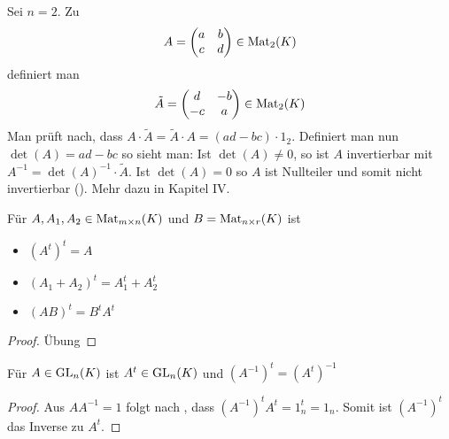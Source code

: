 \begin{example}
	Sei $n=2$. Zu
	\begin{align}
		A=\begin{pmatrix}a & b\\c & d\\\end{pmatrix} \in \operatorname{Mat}_2(K)\notag
	\end{align} 
	definiert man
	\begin{align}
		\tilde A=
		\begin{pmatrix}d & -b\\-c & a\\\end{pmatrix}\in \operatorname{Mat}_2(K)\notag
	\end{align}
	Man prüft nach, dass $A\cdot \tilde A=\tilde A\cdot A=
	(ad-bc)\cdot 1_2$. Definiert man nun $\det(A)=ad-bc$ so sieht man: Ist $\det(A)\neq 0$, so ist $A$ invertierbar mit 
	$A^{-1}=\det(A)^{-1}\cdot \tilde A$. Ist $\det(A)=0$ so $A$ ist Nullteiler und somit nicht invertierbar (). Mehr dazu in Kapitel IV.
\end{example}

\begin{lemma}
	Für $A,A_1,A_2\in \operatorname{Mat}_{m\times n}(K)$ und $B=\operatorname{Mat}_{n\times r}(K)$ ist 
	\begin{itemize}
		\item $(A^t)^t=A$
		\item $(A_1+A_2)^t=A_1^t + A_2^t$
		\item $(AB)^t=B^tA^t$
	\end{itemize}
\end{lemma}
\begin{proof}
	Übung
\end{proof}

\begin{proposition}
	Für $A\in \operatorname{GL}_n(K)$ ist $A^t\in \operatorname{GL}_n(K)$ und $(A^{-1})^t = (A^t)^{-1}$
\end{proposition}
\begin{proof}
	Aus $AA^{-1}=1$ folgt nach , dass $(A^{-1})^tA^t=1_n^t=1_n$. Somit ist $(A^{-1})^t$ das Inverse zu $A^t$.
\end{proof}